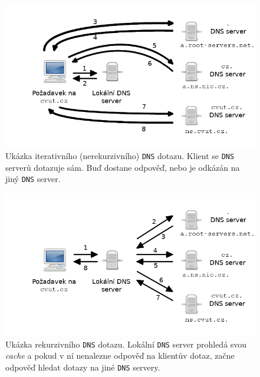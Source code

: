 \documentclass[thesis=M,czech]{FITthesis}[2012/10/20]
\begin{document}
    \pagebreak
    
    

  \begin{figure}
  \centering
    \includegraphics[width=\textwidth]{attachments/dns_iterative.png}
    \caption{Ukázka iterativního (nerekurzivního) \texttt{DNS} dotazu. Klient se \texttt{DNS} serverů dotazuje sám. Buď dostane odpověď, nebo je odkázán na jiný \texttt{DNS} server.}
    \label{pic:dns-iterative}
  \end{figure}
    
  \begin{figure}
  \centering
    \includegraphics[width=\textwidth]{attachments/dns_recursive.png}
    \caption{Ukázka rekurzivního \texttt{DNS} dotazu. Lokální \texttt{DNS} server prohledá svou \textit{cache} a pokud v ní nenalezne odpověď na klientův dotaz, začne odpověď hledat dotazy na jiné \texttt{DNS} servery.}
    \label{pic:dns-recursive}
  \end{figure}


\vfil
\clearpage
\end{document}
